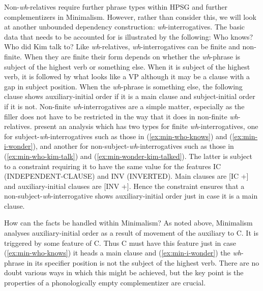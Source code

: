 \documentclass[output=paper]{langsci/langscibook}
\begin{document}
Non-\textit{wh}-relatives require further phrase types within HPSG and further complementizers in Minimalism. However, rather than consider this, we will look at another unbounded dependency construction: \textit{wh}-interrogatives. The basic data that needs to be accounted for is illustrated by the following:
\eal
\ex Who knows? \label{ex:min-who-knows}
\label{ex:min-i-wonder}
\ex Who did Kim talk to? \label{ex:min-who-kim-talk}
\label{ex:min-wonder-kim-talked}
\label{ex:min-wonder-who-talk}
\zl 
Like \textit{wh}-relatives, \textit{wh}-interrogatives can be finite and non-finite. When they are finite their form depends on whether the \textit{wh}-phrase is subject of the highest verb or something else. When it is subject of the highest verb, it is followed by what looks like a VP although it may be a clause with a gap in subject position. When the \textit{wh}-phrase is something else, the following clause shows auxiliary-initial order if it is a main clause and subject-initial order if it is not. Non-finite \textit{wh}-interrogatives are a simple matter, especially as the filler does not have to be restricted in the way that it does in non-finite \textit{wh}-relatives. \citet{GSag2000a-u} present an analysis which has two types for finite \textit{wh}-interrogatives, one for subject-\textit{wh}-interrogatives such as those in (\ref{ex:min-who-knows}) and (\ref{ex:min-i-wonder}), and another for non-subject-\textit{wh}-interrogatives such as those in (\ref{ex:min-who-kim-talk}) and (\ref{ex:min-wonder-kim-talked}). The latter is subject to a constraint requiring it to have the same value for the features IC (INDEPENDENT-CLAUSE) and INV (INVERTED). Main clauses are [IC +] and auxiliary-initial clauses are [INV +]. Hence the constraint ensures that a non-subject-\textit{wh}-interrogative shows auxiliary-initial order just in case it is a main clause.

How can the facts be handled within Minimalism? As noted above, Minimalism analyses auxiliary-initial order as a result of movement of the auxiliary to C. It is triggered by some feature of C. Thus C must have this feature just in case (\ref{ex:min-who-knows}) it heads a main clause and (\ref{ex:min-i-wonder}) the \textit{wh}-phrase in its specifier position is not the subject of the highest verb. There are no doubt various ways in which this might be achieved, but the key point is the properties of a phonologically empty complementizer are crucial. 
\end{document}
